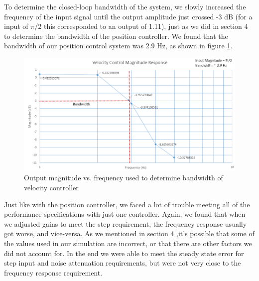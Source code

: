 \documentclass{article}
\theoremstyle{plain}
\theoremstyle{definition}
\theoremstyle{remark}
\begin{document}
To determine the closed-loop bandwidth of the system, we slowly increased the frequency of the input signal until the output amplitude just crossed -3 dB (for a input of $\pi$/2 this corresponded to an output of 1.11), just as we did in section 4 to determine the bandwidth of the position controller. We found that the bandwidth of our position control system was  2.9 Hz, as shown in figure \ref{VelBandwidth}.\\

\begin{figure}[htb]
\begin{center}
\includegraphics[width = 14cm]{VelocityControl_Magnitude.png}
\caption{Output magnitude vs. frequency used to determine bandwidth of velocity controller}
\label{VelBandwidth}
\end{center}
\end{figure}

Just like with the position controller, we faced a lot of trouble meeting all of the performance specifications with just one controller. Again, we found that when we adjusted gains to meet the step requirement, the frequency response usually got worse, and vice-versa. As we mentioned in section 4 ,it's possible that some of the values used in our simulation are incorrect, or that there are other factors we did not account for. In the end we were able to meet the steady state error for step input and noise attenuation requirements, but were not very close to the frequency response requirement.\\

\clearpage
\end{document}
